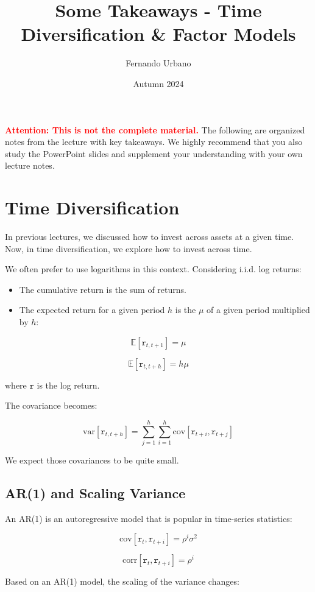\documentclass{article}
\title{Some Takeaways - Time Diversification \& Factor Models}
\author{Fernando Urbano}
\date{Autumn 2024}
\newcommand{\redbold}[1]{\textbf{\textcolor{red}{#1}}}
\begin{document}
\maketitle

\redbold{Attention: This is not the complete material.} The following are organized notes from the lecture with key takeaways. We highly recommend that you also study the PowerPoint slides and supplement your understanding with your own lecture notes.

\section{Time Diversification}

In previous lectures, we discussed how to invest across assets at a given time. Now, in time diversification, we explore how to invest across time.

We often prefer to use logarithms in this context. Considering i.i.d. log returns:
\begin{itemize}
    \item The cumulative return is the sum of returns.
    \item The expected return for a given period \( h \) is the \( \mu \) of a given period multiplied by \( h \):
\end{itemize}

\[
\mathbb{E}[\texttt{r}_{t, t+1}] = \mu
\]

\[
\mathbb{E}[\texttt{r}_{t, t+h}] = h\mu
\]

where \( \texttt{r} \) is the log return.

The covariance becomes:

\[
\text{var}\left[\texttt{r}_{t,t+h} \right] = \sum_{j=1}^{h} \sum_{i=1}^{h} \text{cov} \left[\texttt{r}_{t+i}, \texttt{r}_{t+j} \right]
\]

We expect those covariances to be quite small.

\subsection{AR(1) and Scaling Variance}
An AR(1) is an autoregressive model that is popular in time-series statistics:

\[
\text{cov}\left[\texttt{r}_{t}, \texttt{r}_{t+i} \right] = \rho^i \sigma^2
\]

\[
\text{corr}\left[\texttt{r}_{t}, \texttt{r}_{t+i} \right] = \rho^i
\]

Based on an AR(1) model, the scaling of the variance changes:
\end{document}
